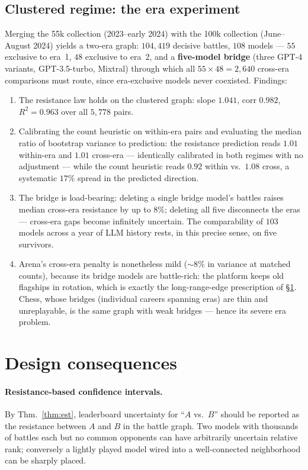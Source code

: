 \documentclass[11pt]{article}
\begin{document}
\subsection{Clustered regime: the era experiment}
Merging the 55k collection (2023--early 2024) with the 100k collection
(June--August 2024) yields a two-era graph: $104{,}419$ decisive battles,
$108$ models --- $55$ exclusive to era~1, $48$ exclusive to era~2, and a
\textbf{five-model bridge} (three GPT-4 variants, GPT-3.5-turbo, Mixtral)
through which all $55 \times 48 = 2{,}640$ cross-era comparisons must
route, since era-exclusive models never coexisted. Findings:
\begin{enumerate}
\item The resistance law holds on the clustered graph: slope $1.041$,
corr $0.982$, $R^2 = 0.963$ over all $5{,}778$ pairs.
\item Calibrating the count heuristic on within-era pairs and evaluating
the median ratio of bootstrap variance to prediction: the resistance
prediction reads $1.01$ within-era and $1.01$ cross-era ---
identically calibrated in both regimes with no adjustment --- while the
count heuristic reads $0.92$ within vs.\ $1.08$ cross, a systematic
$17\%$ spread in the predicted direction.
\item The bridge is load-bearing: deleting a single bridge model's
battles raises median cross-era resistance by up to $8\%$; deleting all
five disconnects the eras --- cross-era gaps become infinitely
uncertain. The comparability of $103$ models across a year of LLM
history rests, in this precise sense, on five survivors.
\item Arena's cross-era penalty is nonetheless mild (${\sim}8\%$ in
variance at matched counts), because its bridge models are battle-rich:
the platform keeps old flagships in rotation, which is exactly the
long-range-edge prescription of \S\ref{sec:design}. Chess, whose
bridges (individual careers spanning eras) are thin and unreplayable,
is the same graph with weak bridges --- hence its severe era problem.
\end{enumerate}

\section{Design consequences}\label{sec:design}

\paragraph{Resistance-based confidence intervals.} By
Thm.~\ref{thm:est}, leaderboard uncertainty for ``$A$ vs.\ $B$'' should
be reported as the resistance between $A$ and $B$ in the battle graph.
Two models with thousands of battles each but no common opponents can
have arbitrarily uncertain relative rank; conversely a lightly played
model wired into a well-connected neighborhood can be sharply placed.
\end{document}
